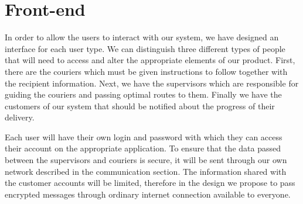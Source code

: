 

\section{Front-end} \label{frontendarch}
In order to allow the users to interact with our system, we have designed an interface for each user type. We can distinguish three different types of people that will need to access and alter the appropriate elements of our product. First, there are the couriers which must be given instructions to follow together with the recipient information. Next, we have the supervisors which are responsible for guiding the couriers and passing optimal routes to them. Finally we have the customers of our system that should be notified about the progress of their delivery.

Each user will have their own login and password with which they can access their account on the appropriate application. To ensure that the data passed between the supervisors and couriers is secure, it will be sent through our own network described in the communication section. The information shared with the customer accounts will be limited, therefore in the design we propose to pass encrypted messages through ordinary internet connection available to everyone.

